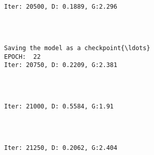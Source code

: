 \documentclass[11pt]{article}
\begin{document}
    \begin{center}
    \end{center}
    { \hspace*{\fill} \\}
    
    \begin{Verbatim}[commandchars=\\\{\}]

Iter: 20500, D: 0.1889, G:2.296
    \end{Verbatim}

    \begin{center}
    \end{center}
    { \hspace*{\fill} \\}
    
    \begin{Verbatim}[commandchars=\\\{\}]

Saving the model as a checkpoint{\ldots}
EPOCH:  22
Iter: 20750, D: 0.2209, G:2.381
    \end{Verbatim}

    \begin{center}
    \end{center}
    { \hspace*{\fill} \\}
    
    \begin{Verbatim}[commandchars=\\\{\}]

Iter: 21000, D: 0.5584, G:1.91
    \end{Verbatim}

    \begin{center}
    \end{center}
    { \hspace*{\fill} \\}
    
    \begin{Verbatim}[commandchars=\\\{\}]

Iter: 21250, D: 0.2062, G:2.404
    \end{Verbatim}
\end{document}
